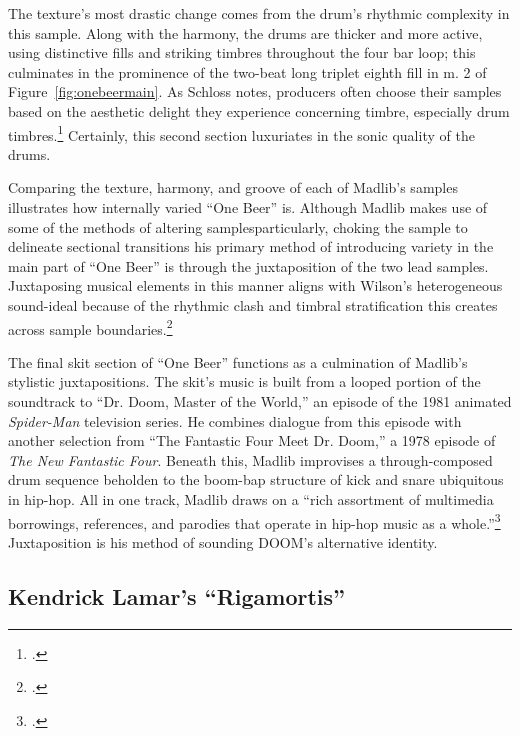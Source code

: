 The texture's most drastic change comes from the drum's rhythmic complexity in this sample.
Along with the harmony, the drums are thicker and more active, using distinctive fills and 
striking timbres throughout the four bar loop; this culminates in the prominence of the 
two-beat long triplet eighth fill in m. 2 of Figure~\ref{fig:onebeermain}. As Schloss notes,
producers often choose their samples based on the aesthetic delight they experience concerning
timbre, especially drum timbres.\footnote{
    \autocite[141--143]{josephgschlossMakingBeatsArt2004}.} 
Certainly, this second section luxuriates in the sonic quality of the drums.

Comparing the texture, harmony, and groove of each of Madlib's samples illustrates how internally
varied ``One Beer'' is. Although Madlib makes use of some of the methods of altering 
samples\textemdash particularly, choking the sample to delineate sectional transitions\textemdash
his primary method of introducing variety in the main part of ``One Beer'' is through the 
juxtaposition of the two lead samples. Juxtaposing musical elements in this manner aligns with 
Wilson's heterogeneous sound-ideal because of the rhythmic clash and timbral stratification
this creates across sample boundaries.\footnote{
    \autocite[329--329]{ollywilsonHeterogeneousSoundIdeal1992}.}

The final skit section of ``One Beer'' functions as a culmination of Madlib's stylistic 
juxtapositions. The skit's music is built from a looped portion of the soundtrack to ``Dr. Doom,
Master of the World,''  an episode of the 1981 animated \textit{Spider-Man} television series. He
combines dialogue from this episode with another selection from ``The Fantastic Four Meet Dr. 
Doom,'' a 1978 episode of \textit{The New Fantastic Four}. Beneath this, Madlib improvises a 
through-composed drum sequence beholden to the boom-bap structure of kick and snare ubiquitous
in hip-hop. All in one track, Madlib draws on a ``rich assortment of multimedia borrowings, 
references, and parodies that operate in hip-hop music as a whole.''\footnote{
    \autocite[42]{joannademersSampling1970sHipHop2003}.} 
Juxtaposition is his method  of sounding DOOM's alternative identity.

\subsection*{\centering Kendrick Lamar's ``Rigamortis''}

